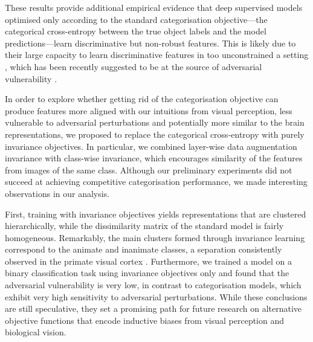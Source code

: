 {These results provide additional empirical evidence that deep supervised models optimised only according to the standard categorisation objective---the categorical cross-entropy between the true object labels and the model predictions---learn discriminative but non-robust features. This is likely due to their large capacity to learn discriminative features in too unconstrained a setting \citep{geirhos2020shortcutlearning, malhotra2020bioconstraints}, which has been recently suggested to be at the source of adversarial vulnerability \citep{ilyas2019advfeatures}.

In order to explore whether getting rid of the categorisation objective can produce features more aligned with our intuitions from visual perception, less vulnerable to adversarial perturbations and potentially more similar to the brain representations, we proposed to replace the categorical cross-entropy with purely invariance objectives. In particular, we combined layer-wise data augmentation invariance with class-wise invariance, which encourages similarity of the features from images of the same class. Although our preliminary experiments did not succeed at achieving competitive categorisation performance, we made interesting observations in our analysis.

First, training with invariance objectives yields representations that are clustered hierarchically, while the dissimilarity matrix of the standard model is fairly homogeneous. Remarkably, the main clusters formed through invariance learning correspond to the animate and inanimate classes, a separation consistently observed in the primate visual cortex \cite{kriegeskorte2008manandmonkey, bao2020itmaps}. Furthermore, we trained a model on a binary classification task using invariance objectives only and found that the adversarial vulnerability is very low, in contrast to categorisation models, which exhibit very high sensitivity to adversarial perturbations. While these conclusions are still speculative, they set a promising path for future research on alternative objective functions that encode inductive biases from visual perception and biological vision.

\chapterbibliography
}

